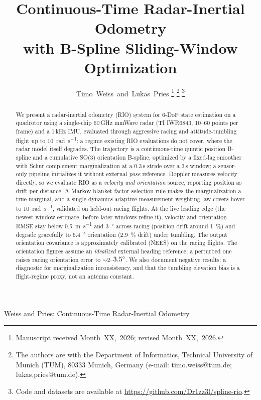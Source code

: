 \documentclass[journal]{IEEEtran}
\begin{document}
\title{Continuous-Time Radar-Inertial Odometry\\with B-Spline Sliding-Window Optimization}

\author{Timo~Weiss~and~Lukas~Pries%
\thanks{Manuscript received Month~XX,~2026; revised Month~XX,~2026.}%
\thanks{The authors are with the Department of Informatics, Technical
University of Munich (TUM), 80333 Munich, Germany (e-mail:
timo.weiss@tum.de; lukas.pries@tum.de).}%
\thanks{Code and datasets are available at
\protect\url{https://github.com/Dr1zz3l/spline-rio}.}}

%
{Weiss and Pries: Continuous-Time Radar-Inertial Odometry}

\maketitle

\begin{abstract}
We present a radar-inertial odometry (RIO) system for 6-DoF state
estimation on a quadrotor using a single-chip 60\,GHz mmWave radar
(TI IWR6843, 10--60 points per frame) and a 1\,kHz IMU, evaluated through aggressive
racing and attitude-tumbling flight up to \SI{10}{\radian\per\second}:
a regime existing RIO evaluations do not cover, where the radar
model itself degrades.  The trajectory is a continuous-time quintic
position B-spline and a cumulative SO(3) orientation B-spline, optimized
by a fixed-lag smoother with Schur complement marginalization at a
0.3\,s stride over a 3\,s window; a sensor-only pipeline initializes it
without external \emph{pose} reference.  Doppler measures velocity
directly, so we evaluate RIO as a \emph{velocity and orientation}
source, reporting position as drift per distance.  A Markov-blanket
factor-selection rule makes the marginalization a true marginal, and a
single dynamics-adaptive measurement-weighting law covers hover to
\SI{10}{\radian\per\second}, validated on held-out racing flights.  At the live
leading edge (the newest window estimate, before later windows refine
it), velocity and orientation RMSE stay below
\SI{0.5}{\metre\per\second} and \SI{3}{\degree} across racing (position
drift around \SI{1}{\percent}) and degrade gracefully to
\SI{6.4}{\degree} orientation (\SI{2.9}{\percent} drift) under tumbling.
The output
orientation covariance is approximately calibrated (NEES) on the racing
flights. The orientation figures assume an \emph{idealized} external heading
reference; a perturbed one raises racing orientation error to ${\sim}2$--$3.5\degree$.
We also document negative
results: a diagnostic for marginalization inconsistency, and that the
tumbling elevation bias is a flight-regime proxy, not an antenna
constant.
\end{abstract}
\end{document}
